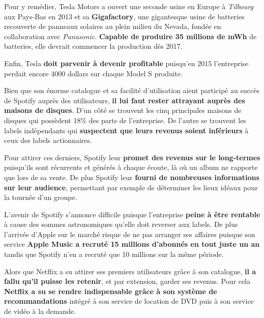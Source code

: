 Pour y remédier, Tesla Motors a ouvert une seconde usine en Europe à \textit{Tilbourg} aux Pays-Bas en 2013\supercite{TeslaTilburgFactory} et sa \textbf{Gigafactory}, une gigantesque usine de batteries recouverte de panneaux solaires au plein milieu du Nevada, fondée en collaboration avec \textit{Panasonic}. \textbf{Capable de produire 35 millions de mWh} de batteries, elle devrait commencer la production dès 2017\supercite{Gigafactory}.

Enfin, Tesla \textbf{doit parvenir à devenir profitable} puisqu'en 2015 l'entreprise perdait encore 4000 dollars sur chaque Model S produite\supercite{TeslaLoses}.

\vspace{5mm}

Bien que son énorme catalogue et sa facilité d'utilisation aient participé au succès de Spotify auprès des utilisateurs, \textbf{il lui faut rester attrayant auprès des maisons de disques}. D'un côté se trouvent les cinq principales maisons de disques qui possèdent 18\% des parts de l'entreprise\supercite{LabelsOwnSpotify}. De l'autre se trouvent les labels indépendants qui \textbf{suspectent que leurs revenus soient inférieurs} à ceux des labels actionnaires\supercite{SpotifyBloomberg}.

Pour attirer ces derniers, Spotify leur \textbf{promet des revenus sur le long-termes} puisqu'ils sont récurrents et générés à chaque écoute, là où un album ne rapporte que lors de sa vente. De plus Spotify leur \textbf{fourni de nombreuses informations sur leur audience}, permettant par exemple de déterminer les lieux idéaux pour la tournée d'un groupe.

L'avenir de Spotify s'annonce difficile puisque l'entreprise \textbf{peine à être rentable} à cause des sommes astronomiques qu'elle doit reverser aux labels\supercite{SpotifyChiffres2015}. De plus l'arrivée d'Apple sur le marché risque de ne pas arranger ses affaires puisque son service \textbf{Apple Music a recruté 15 millions d'abonnés en tout juste un an}\supercite{AppleMusic15Million} tandis que Spotify n'en a recruté que 10 millions sur la même période.

\vspace{5mm}

Alors que Netflix a su attirer ses premiers utilisateurs grâce à son catalogue, \textbf{il a fallu qu'il puisse les retenir}, et par extension, garder ses revenus. Pour cela\textbf{ Netflix a su se rendre indispensable grâce à son système de recommandations} intégré à son service de location de DVD puis à son service de vidéo à la demande.

